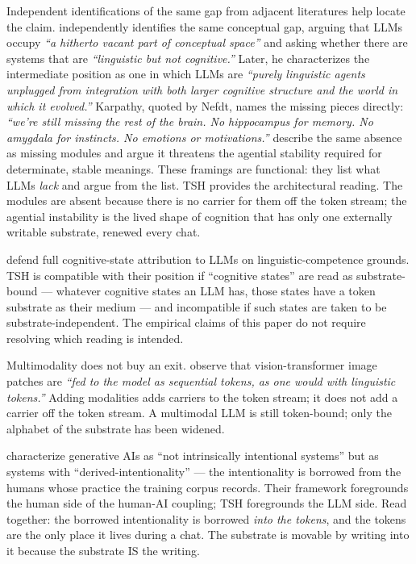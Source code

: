 \documentclass[11pt,a4paper]{article}
\begin{document}
Independent identifications of the same gap from adjacent literatures help locate the claim. \citet{nefdt2026linguistic} independently identifies the same conceptual gap, arguing that LLMs occupy \textit{``a hitherto vacant part of conceptual space''} and asking whether there are systems that are \textit{``linguistic but not cognitive.''} Later, he characterizes the intermediate position as one in which LLMs are \textit{``purely linguistic agents unplugged from integration with both larger cognitive structure and the world in which it evolved.''} Karpathy, quoted by Nefdt, names the missing pieces directly: \textit{``we're still missing the rest of the brain. No hippocampus for memory. No amygdala for instincts. No emotions or motivations.''} \citet[\S4.2]{milliere2024wayforward} describe the same absence as missing modules and argue it threatens the agential stability required for determinate, stable meanings. These framings are functional: they list what LLMs \textit{lack} and argue from the list. TSH provides the architectural reading. The modules are absent because there is no carrier for them off the token stream; the agential instability is the lived shape of cognition that has only one externally writable substrate, renewed every chat.

\citet{cappelen2025whole} defend full cognitive-state attribution to LLMs on linguistic-competence grounds. TSH is compatible with their position if ``cognitive states'' are read as substrate-bound --- whatever cognitive states an LLM has, those states have a token substrate as their medium --- and incompatible if such states are taken to be substrate-independent. The empirical claims of this paper do not require resolving which reading is intended.

Multimodality does not buy an exit. \citet[\S3.1.1]{milliere2024wayforward} observe that vision-transformer image patches are \textit{``fed to the model as sequential tokens, as one would with linguistic tokens.''} Adding modalities adds carriers to the token stream; it does not add a carrier off the token stream. A multimodal LLM is still token-bound; only the alphabet of the substrate has been widened.

\citet{barandiaran2025generative} characterize generative AIs as ``not intrinsically intentional systems'' but as systems with ``derived-intentionality'' --- the intentionality is borrowed from the humans whose practice the training corpus records. Their framework foregrounds the human side of the human-AI coupling; TSH foregrounds the LLM side. Read together: the borrowed intentionality is borrowed \textit{into the tokens}, and the tokens are the only place it lives during a chat. The substrate is movable by writing into it because the substrate IS the writing.
\end{document}
